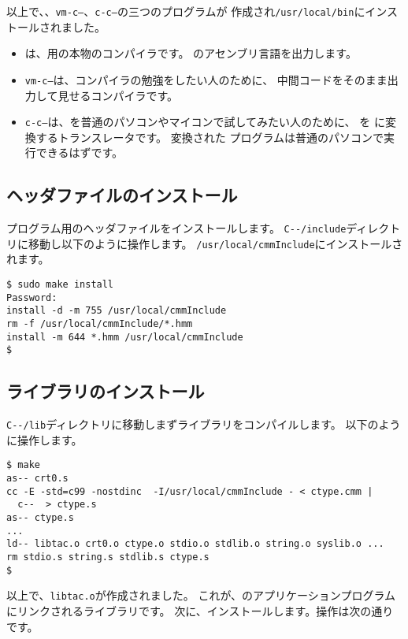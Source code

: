 以上で、\cmmc 、{\tt vm-c--}、{\tt c-c--}の三つのプログラムが
作成され\verb;/usr/local/bin;にインストールされました。

\begin{itemize}
\item {\cmmc}は、\tac 用の本物のコンパイラです。
\tac のアセンブリ言語を出力します。
\item {\tt vm-c--}は、コンパイラの勉強をしたい人のために、
中間コードをそのまま出力して見せるコンパイラです。
\item {\tt c-c--}は、\cmml を普通のパソコンやマイコンで試してみたい人のために、
\cmml を \cl に変換するトランスレータです。
変換された \cl プログラムは普通のパソコンで実行できるはずです。
\end{itemize}

\subsection{ヘッダファイルのインストール}

\cmml プログラム用のヘッダファイルをインストールします。
\verb;C--/include;ディレクトリに移動し以下のように操作します。
\verb;/usr/local/cmmInclude;にインストールされます。


\begin{mylist}
\begin{verbatim}
$ sudo make install
Password:
install -d -m 755 /usr/local/cmmInclude
rm -f /usr/local/cmmInclude/*.hmm
install -m 644 *.hmm /usr/local/cmmInclude
$
\end{verbatim}
\end{mylist}

\subsection{ライブラリのインストール}

\verb;C--/lib;ディレクトリに移動しまずライブラリをコンパイルします。
以下のように操作します。

\begin{mylist}
\begin{verbatim}
$ make
as-- crt0.s
cc -E -std=c99 -nostdinc  -I/usr/local/cmmInclude - < ctype.cmm |
  c--  > ctype.s
as-- ctype.s
...
ld-- libtac.o crt0.o ctype.o stdio.o stdlib.o string.o syslib.o ...
rm stdio.s string.s stdlib.s ctype.s
$
\end{verbatim}
\end{mylist}

以上で、\verb;libtac.o;が作成されました。
これが、\tacos のアプリケーションプログラムにリンクされるライブラリです。
次に、インストールします。操作は次の通りです。

